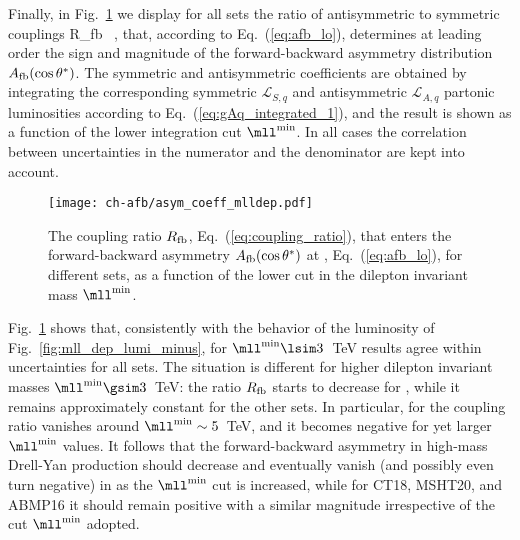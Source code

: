 Finally, in Fig.~\ref{fig:asym_coeff_mlldep} we display for all
\pdf sets the
ratio of antisymmetric to symmetric couplings
\be
\label{eq:coupling_ratio}
R_{\rm fb}\equiv {} \, ,
\ee
that, according to
Eq.~(\ref{eq:afb_lo}), determines at leading order
the sign and magnitude
of the forward-backward asymmetry distribution $A_{\rm fb}(\cos\theta^*)$.
%
The symmetric and antisymmetric coefficients are obtained by integrating
the corresponding symmetric $\mathcal{L}_{S,q}$ and antisymmetric
$\mathcal{L}_{A,q}$ partonic luminosities according to
Eq.~(\ref{eq:gAq_integrated_1}), and the result is shown as a function of the lower integration cut $\mll^{\rm min}$.
%
In all cases the correlation between \pdf uncertainties in the numerator and
the denominator are kept into account.

\begin{figure}[!t]
 \centering
 \texttt{[image: ch-afb/asym\_coeff\_mlldep.pdf]}
 \caption{The coupling ratio $R_{\rm fb}$,
   Eq.~(\ref{eq:coupling_ratio}),
   that enters the forward-backward asymmetry $A_{\rm
     fb}(\cos\theta^*)$ at \lo,  Eq.~(\ref{eq:afb_lo}), for different \pdf
   sets, as  a function of the lower cut in the dilepton
   invariant mass $\mll^{\rm min}$.
 }    
 \label{fig:asym_coeff_mlldep}
\end{figure}

Fig.~\ref{fig:asym_coeff_mlldep} shows that, consistently
with the behavior of the luminosity of
Fig.~\ref{fig:mll_dep_lumi_minus},  for $\mll^{{\rm
    min}}\lsim 3$~TeV results agree within uncertainties for all \pdf
sets.
%
The situation is different for higher dilepton invariant masses $\mll^{{\rm min}}\gsim 3$~TeV:
the ratio $R_{\rm fb}$ starts to decrease for , while it
remains approximately  constant 
for the other  \pdf sets. In particular, for  the coupling ratio
vanishes around $\mll^{{\rm min}}\sim5$~TeV, and it becomes negative
for yet larger   $\mll^{{\rm min}}$ values.
It follows that the forward-backward
asymmetry in high-mass Drell-Yan production should decrease  and
eventually vanish (and possibly even turn negative)
in  as the $\mll^{{\rm min}}$ cut is increased,
while for CT18, MSHT20, and ABMP16 it should remain positive
with a similar magnitude irrespective of the cut  $\mll^{{\rm min}}$ adopted.

